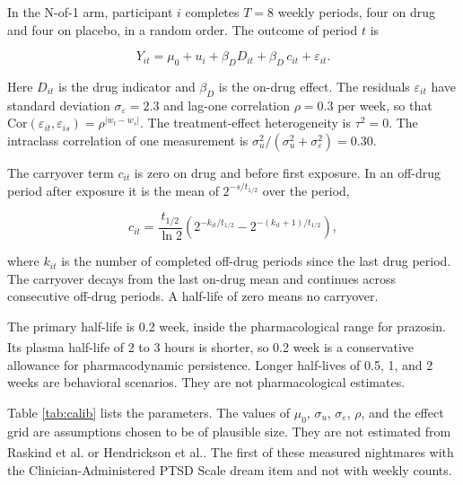 \documentclass[
  11pt,
]{article}
\begin{document}
In the N-of-1 arm, participant \(i\) completes \(T = 8\) weekly periods, four on drug and four on placebo, in a random order. The outcome of period \(t\) is

\[Y_{it} = \mu_0 + u_i + \beta_D D_{it} + \beta_D\, c_{it} + \varepsilon_{it}.\]

Here \(D_{it}\) is the drug indicator and \(\beta_D\) is the on-drug effect. The residuals \(\varepsilon_{it}\) have standard deviation \(\sigma_\varepsilon = 2.3\) and lag-one correlation \(\rho = 0.3\) per week, so that \(\mathrm{Cor}(\varepsilon_{it}, \varepsilon_{is}) = \rho^{|w_t - w_s|}\). The treatment-effect heterogeneity is \(\tau^2 = 0\). The intraclass correlation of one measurement is \(\sigma_u^2/(\sigma_u^2 + \sigma_\varepsilon^2) = 0.30\).

The carryover term \(c_{it}\) is zero on drug and before first exposure. In an off-drug period after exposure it is the mean of \(2^{-s/t_{1/2}}\) over the period,

\[c_{it} = \frac{t_{1/2}}{\ln 2}\left(2^{-k_{it}/t_{1/2}} - 2^{-(k_{it}+1)/t_{1/2}}\right),\]

where \(k_{it}\) is the number of completed off-drug periods since the last drug period. The carryover decays from the last on-drug mean and continues across consecutive off-drug periods. A half-life of zero means no carryover.

The primary half-life is 0.2 week, inside the pharmacological range for prazosin. Its plasma half-life of 2 to 3 hours\textsuperscript{} is shorter, so 0.2 week is a conservative allowance for pharmacodynamic persistence. Longer half-lives of 0.5, 1, and 2 weeks are behavioral scenarios. They are not pharmacological estimates.

Table \ref{tab:calib} lists the parameters. The values of \(\mu_0\), \(\sigma_u\), \(\sigma_\varepsilon\), \(\rho\), and the effect grid are assumptions chosen to be of plausible size. They are not estimated from Raskind et al.\textsuperscript{} or Hendrickson et al.\textsuperscript{}. The first of these measured nightmares with the Clinician-Administered PTSD Scale dream item and not with weekly counts.
\end{document}
